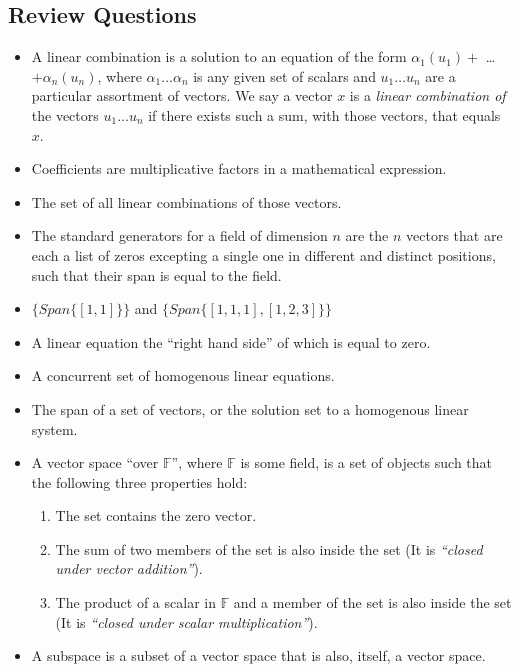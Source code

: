 \documentclass{article}
\begin{document}
    \subsection{Review Questions}
    \begin{itemize}
        \item A linear combination is a solution to an equation of the form
            $\alpha{}_1(u_1) + $ \ldots $ + \alpha{}_n(u_n)$, where $\alpha{}_1 \ldots \alpha{}_n$ is
            any given set of scalars and $u_1 \ldots u_n$ are a particular assortment of
            vectors. We say a vector $x$ is a \textit{linear combination of}
            the vectors $u_1 \ldots u_n$ if there exists such a sum, with
            those vectors, that equals $x$.
        \item Coefficients are multiplicative factors in a mathematical expression.
        \item The set of all linear combinations of those vectors.
        \item The standard generators for a field of dimension $n$ are the $n$ vectors 
            that are each a list of zeros excepting a single one in different and distinct
            positions, such that their span is equal to the field.
        \item $\{Span \{[1,1]\}\}$ and $\{Span \{[1,1,1], [1,2,3]\}\}$
        \item A linear equation the ``right hand side'' of which is equal to zero.
        \item A concurrent set of homogenous linear equations.
        \item The span of a set of vectors, or the solution set to a homogenous linear system.
        \item A vector space ``over $\mathbb{F}$'', where $\mathbb{F}$ is some
            field, is a set of objects such that the following three
            properties hold:
            \begin{enumerate}
                \item The set contains the zero vector.
                \item The sum of two members of the set is also inside the set (It is \textit{``closed under vector addition''}).
                \item The product of a scalar in $\mathbb{F}$ and a member of the set is also inside the set (It is \textit{``closed under scalar multiplication''}).
            \end{enumerate}
        \item A subspace is a subset of a vector space that is also, itself, a vector space.

\end{itemize}
\end{document}
